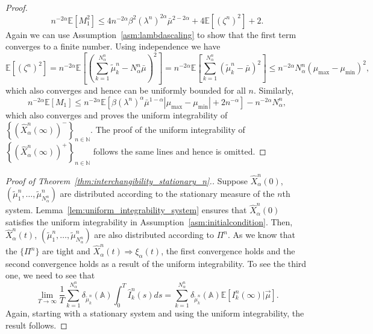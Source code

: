 \documentclass[a4paper,11pt,twoside]{article}
\numberwithin{equation}{section}
\numberwithin{figure}{section}
\theoremstyle{plain}
\newcommand{\AAA}{\mathbb{A}}
\newcommand{\EE}{\mathbb{E}}
\newcommand{\NN}{\mathbb{N}}
\newcommand{\1}{\mathbbm{1}}
\begin{document}
\begin{proof}
\[
n^{-2\alpha}\EE\left[M_1^2\right]\leq 4n^{-2\alpha}\beta^2\left(\lambda^n\right)^{2\alpha}\bar{\mu}^{2-2\alpha}+4\EE[(\zeta^n)^2] +2.
\]
Again we can use Assumption~\ref{asm:lambdascaling} to show that the first term converges to a finite number. Using independence we have 
\[
\EE[(\zeta^n)^2]=n^{-2\alpha}\EE\left[\left(\sum_{k=1}^{N^n_\alpha}\tilde{\mu}_k^n-N^n_\alpha\bar{\mu}\right)^2\right]=n^{-2\alpha}\EE\left[\sum_{k=1}^{N^n_\alpha}\left(\tilde{\mu}_k^n-\bar{\mu}\right)^2\right]\leq n^{-2\alpha}N^n_\alpha(\mu_{\max}-\mu_{\min})^2,
\]
which also converges and hence can be uniformly bounded for all $n$. Similarly, 
\[
n^{-2\alpha}\EE[M_1]\leq n^{-2\alpha}\EE[\beta\left(\lambda^n\right)^\alpha\bar{\mu}^{1-\alpha} |\mu_{\max}-\mu_{\min}|+2n^{-\alpha}] -n^{-2\alpha}N^n_\alpha,
\]
which also converges and proves the uniform integrability of $\left\{\left(\hat{X}_\alpha^n(\infty)\right)^-\right\}_{n\in \NN}$. The proof of the uniform integrability of $\left\{\left(\hat{X}_\alpha^n(\infty)\right)^+\right\}_{n\in \NN}$ follows the same lines and hence is omitted. 
\end{proof}



\begin{proof}[Proof of Theorem~\ref{thm:interchangibility_stationary_n}.]
Suppose $\hat{X}_\alpha^n(0)$, $(\tilde{\mu}_1^n, \ldots, \tilde{\mu}_{N_{\alpha}^n}^n)$ are distributed according to the stationary measure of the $n$th system. Lemma~\ref{lem:uniform_integrability_system} ensures that $\hat{X}_\alpha^n(0)$ satisfies the uniform integrability in Assumption~\ref{asm:initialcondition}. Then, $\hat{X}_\alpha^n(t)$, $(\tilde{\mu}_1^n, \ldots, \tilde{\mu}_{N_{\alpha}^n}^n)$ are also distributed according to $\Pi^n$. As we know that the $\{\Pi^n\}$ are tight and $\hat{X}_\alpha^n(t)\Rightarrow \xi_\alpha(t)$, the first convergence holds and the second convergence holds as a result of the uniform integrability. To see the third one, we need to see that 
\[\lim_{T\to\infty}\frac{1}{T}\sum_{k=1}^{N^n_\alpha}\delta_{\tilde{\mu}_k^n}(\AAA)\int_0^T\hat{I}_k^n(s)ds=\sum_{k=1}^{N^n_\alpha}\delta_{\tilde{\mu}_k^n}(\AAA)\EE[I_k^n(\infty)|\vec{\mu}].\]
Again, starting with a stationary system and using the uniform integrability, the result follows. 
\end{proof}
\end{document}
